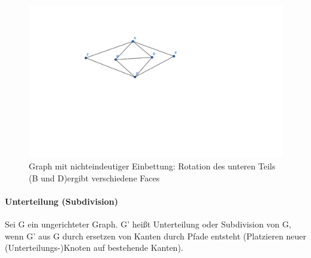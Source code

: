\begin{figure}[h]
    \begin{center}
        \includegraphics[width=15cm]{einbettung}
        \caption{Graph mit nichteindeutiger Einbettung: Rotation des unteren Teils (B und D)ergibt verschiedene Faces}
        \label{fig:}
    \end{center}
\end{figure}

\paragraph{Unterteilung (Subdivision)}
Sei G ein ungerichteter Graph. G' heißt Unterteilung oder Subdivision von G, wenn G' aus G durch ersetzen von Kanten durch Pfade entsteht (Platzieren neuer (Unterteilungs-)Knoten auf bestehende Kanten).

